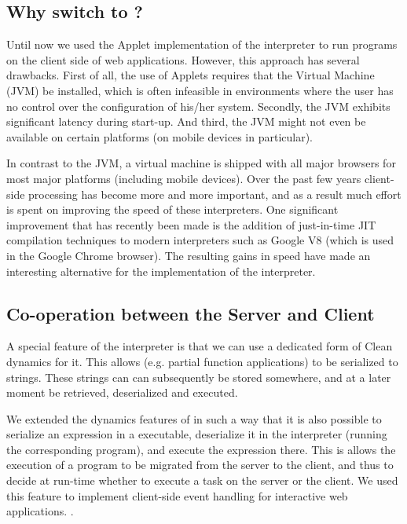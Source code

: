 \subsection{Why switch to \JS?}
Until now we used the \Java Applet implementation of the \Sapl interpreter to
run \Clean programs on the client side of web applications. However, this
approach has several drawbacks. First of all, the use of \Java Applets requires
that the \Java Virtual Machine (JVM) be installed, which is often infeasible in
environments where the user has no control over the configuration of his/her
system. Secondly, the JVM exhibits significant latency during start-up. And
third, the JVM might not even be available on certain platforms (on mobile
devices in particular).

In contrast to the JVM, a \JavaScript virtual machine is shipped with all major 
browsers for most major platforms (including mobile devices). Over the past few
years client-side processing has become more and more important, and as a result
much effort is spent on improving the speed of these \JS interpreters. One
significant improvement that has recently been made is the addition of
just-in-time \textsf{JIT} compilation techniques to modern \JS interpreters such
as Google V8 (which is used in the Google Chrome browser). The resulting gains
in speed have made \JS an interesting alternative for the implementation of the
\Sapl interpreter.

\subsection{Co-operation between the Server and Client}
A special feature of the \Sapl interpreter is that we can use a dedicated form
of \textsf{Clean} dynamics \cite{DYNAMICS} for it. This allows \Clean (e.g.
partial function applications) to be serialized to strings. These strings can
can subsequently be stored somewhere, and at a later moment be retrieved,
deserialized and executed.

We extended the dynamics features of \Clean in  such a way that it is also
possible to serialize an expression in a \Clean executable, deserialize it
in the \Sapl interpreter (running the corresponding \Sapl program), and execute
the expression there. This is allows the execution of a \Clean program to be
migrated from the server to the client, and thus to decide at run-time whether
to execute a task on the server or the client. We used this feature to
implement client-side event handling for interactive web applications.
\cite{iEditors}. 
